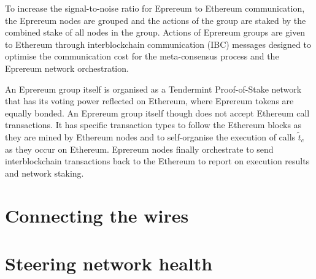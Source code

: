 \documentclass[twocolumn]{article}
\begin{document}
To increase the signal-to-noise ratio for Eprereum to Ethereum communication, the Eprereum nodes are grouped and the actions of the group are staked by the combined stake of all nodes in the group. Actions of Eprereum groups are given to Ethereum through interblockchain communication (IBC) messages designed to optimise the communication cost for the meta-consensus process and the Eprereum network orchestration.  

An Eprereum group itself is organised as a Tendermint Proof-of-Stake network that has its voting power reflected on Ethereum, where Eprereum tokens are equally bonded.  An Eprereum group itself though does not accept Ethereum call transactions.  It has specific transaction types to follow the Ethereum blocks as they are mined by Ethereum nodes and to self-organise the execution of calls $\tilde{t}_c$ as they occur on Ethereum. Eprereum nodes finally orchestrate to send interblockchain transactions back to the Ethereum to report on execution results and network staking.


\section{Connecting the wires}
\section{Steering network health}


\end{document}
